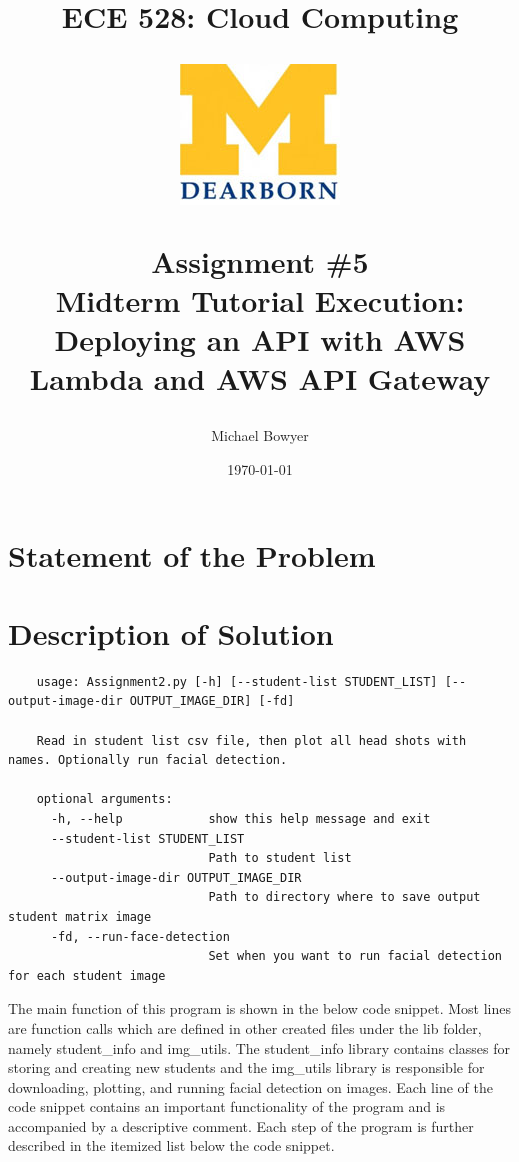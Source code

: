 \documentclass[12pt, letterpaper, final, onecolumn, titlepage] {article}
\title{ECE 528: Cloud Computing \\
	\vspace{1.5cm}
   		\begin{center}\includegraphics{umlogo} \end{center}
	\vspace{1.5cm}
	\textbf{Assignment \#5} \\
Midterm Tutorial Execution: Deploying an API with AWS Lambda and AWS API Gateway}
\author{Michael Bowyer}
\date{\today}
\begin{document}
\maketitle

\doublespacing

\section{Statement of the Problem}


\pagebreak
\section{Description of Solution}



\singlespacing
\begin{lstlisting}
	usage: Assignment2.py [-h] [--student-list STUDENT_LIST] [--output-image-dir OUTPUT_IMAGE_DIR] [-fd]

	Read in student list csv file, then plot all head shots with names. Optionally run facial detection.
	
	optional arguments:
	  -h, --help            show this help message and exit
	  --student-list STUDENT_LIST
							Path to student list
	  --output-image-dir OUTPUT_IMAGE_DIR
							Path to directory where to save output student matrix image
	  -fd, --run-face-detection
							Set when you want to run facial detection for each student image
\end{lstlisting}
\doublespacing

The main function of this program is shown in the below code snippet. Most lines are function calls which are defined in other created files under the lib folder, namely student\_info and img\_utils. The student\_info library contains classes for storing and creating new students and the img\_utils library is responsible for downloading, plotting, and running facial detection on images. Each line of the code snippet contains an important functionality of the program and is accompanied by a descriptive comment. Each step of the program is further described in the itemized list below the code snippet.
\end{document}
